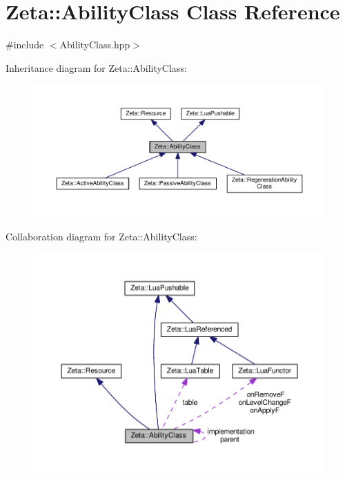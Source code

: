\hypertarget{classZeta_1_1AbilityClass}{\section{Zeta\+:\+:Ability\+Class Class Reference}
\label{classZeta_1_1AbilityClass}
}


{\ttfamily \#include $<$Ability\+Class.\+hpp$>$}



Inheritance diagram for Zeta\+:\+:Ability\+Class\+:\nopagebreak
\begin{figure}[H]
\begin{center}
\leavevmode
\includegraphics[width=350pt]{classZeta_1_1AbilityClass__inherit__graph}
\end{center}
\end{figure}


Collaboration diagram for Zeta\+:\+:Ability\+Class\+:\nopagebreak
\begin{figure}[H]
\begin{center}
\leavevmode
\includegraphics[width=350pt]{classZeta_1_1AbilityClass__coll__graph}
\end{center}
\end{figure}
